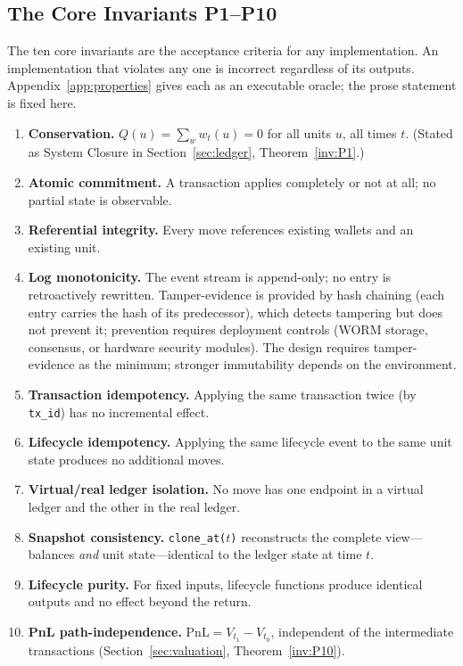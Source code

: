 \subsection{The Core Invariants P1--P10}
\label{sec:sec15-core}

The ten core invariants are the acceptance criteria for any implementation. An implementation that violates any one is incorrect regardless of its outputs. Appendix~\ref{app:properties} gives each as an executable oracle; the prose statement is fixed here.

\begin{enumerate}
\item[\textbf{P1}] \textbf{Conservation.} $Q(u)=\sum_w w_t(u)=0$ for all units $u$, all times $t$. (Stated as System Closure in Section~\ref{sec:ledger}, Theorem~\ref{inv:P1}.)
\item[\textbf{P2}] \textbf{Atomic commitment.}\label{inv:P2} A transaction applies completely or not at all; no partial state is observable.
\item[\textbf{P3}] \textbf{Referential integrity.}\label{inv:P3} Every move references existing wallets and an existing unit.
\item[\textbf{P4}] \textbf{Log monotonicity.}\label{inv:P4} The event stream is append-only; no entry is retroactively rewritten. Tamper-evidence is provided by hash chaining (each entry carries the hash of its predecessor), which detects tampering but does not prevent it; prevention requires deployment controls (WORM storage, consensus, or hardware security modules). The design requires tamper-evidence as the minimum; stronger immutability depends on the environment.
\item[\textbf{P5}] \textbf{Transaction idempotency.}\label{inv:P5} Applying the same transaction twice (by \texttt{tx\_id}) has no incremental effect.
\item[\textbf{P6}] \textbf{Lifecycle idempotency.}\label{inv:P6} Applying the same lifecycle event to the same unit state produces no additional moves.
\item[\textbf{P7}] \textbf{Virtual/real ledger isolation.}\label{inv:P7} No move has one endpoint in a virtual ledger and the other in the real ledger.
\item[\textbf{P8}] \textbf{Snapshot consistency.}\label{inv:P8} \texttt{clone\_at($t$)} reconstructs the complete view---balances \emph{and} unit state---identical to the ledger state at time $t$.
\item[\textbf{P9}] \textbf{Lifecycle purity.}\label{inv:P9} For fixed inputs, lifecycle functions produce identical outputs and no effect beyond the return.
\item[\textbf{P10}] \textbf{PnL path-independence.} $\mathrm{PnL}=V_{t_1}-V_{t_0}$, independent of the intermediate transactions (Section~\ref{sec:valuation}, Theorem~\ref{inv:P10}).
\end{enumerate}

